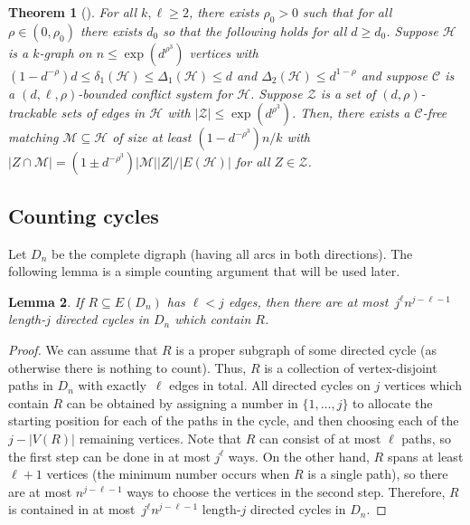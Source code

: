 \documentclass[a4paper, 11pt,reqno]{amsart}
\newcommand{\calC}{\mathcal{C}}
\newcommand{\calH}{\mathcal{H}}
\newcommand{\calM}{\mathcal{M}}
\theoremstyle{plain}
\newtheorem{theorem}{Theorem}[section]
\newtheorem{lemma}[theorem]{Lemma}
\theoremstyle{definition}
\numberwithin{equation}{section}
\begin{document}
\begin{theorem}[{\cite[Theorem 3.2]{GJKKL2022}}] \label{theorem:hypergraphmatching}
	For all $k, \ell \geq 2$, there exists $\rho_0 > 0$ such that for all 
	$\rho \in (0, \rho_0)$ there exists $d_0$ so that the following holds for all $d \geq d_0$.
	Suppose $\calH$ is a $k$-graph on $n \leq \exp(d^{\rho^3})$ vertices with 
	$(1 - d^{-\rho})d \leq \delta_1(\calH) \leq \Delta_1(\calH) \leq d$ 
	and $\Delta_2(\calH) \leq d^{1 - \rho}$ and suppose $\calC$ is 
	a $(d, \ell, \rho)$-bounded conflict system for $\calH$.
	Suppose $\mathcal{Z}$ is a set of $(d, \rho)$-trackable 
	sets of edges in $\calH$ with ${|\mathcal{Z}| \leq \exp(d^{\rho^3})}$.
	Then, there exists a $\calC$-free matching $\calM \subseteq \calH$ of size at least 
	${(1 - d^{-\rho^3})n/k}$ with $|Z \cap \calM| = (1 \pm d^{-\rho^3}) |\calM| |Z| / |E(\calH)|$ 
	for all $Z \in \mathcal{Z}$.
\end{theorem}

\subsection{Counting cycles}

Let $D_n$ be the complete digraph (having all arcs in both directions).
The following lemma is a simple counting argument that will be used later.

\begin{lemma} \label{lemma:countingcycles}
	If $R \subseteq E(D_n)$ has $\ell < j$ edges, then there are at most~$j^\ell n^{j - \ell - 1}$ 
	length-$j$ directed cycles in $D_n$ which contain $R$.
\end{lemma}

\begin{proof}
We can assume that $R$ is a proper subgraph of some directed cycle (as
otherwise there is nothing to count).  Thus, $R$ is a collection of
vertex-disjoint paths in $D_n$ with exactly~$\ell$ edges in total.  All
directed cycles on $j$ vertices which contain $R$ can be obtained by
assigning a number in $\{1, \dotsc, j\}$ to allocate the starting
position for each of the paths in the cycle, and then choosing each of
the $j - |V(R)|$ remaining vertices.  Note that $R$ can consist of at
most $\ell$ paths, so the first step can be done in at most $j^\ell$
ways.  On the other hand, $R$ spans at least $\ell + 1$ vertices (the
minimum number occurs when $R$ is a single path), so there are at most $n^{j
  - \ell - 1}$ ways to choose the vertices in the second step.
Therefore, $R$ is contained in at most~$j^\ell n^{j - \ell - 1}$
length-$j$ directed cycles in $D_n$.
\end{proof}
\end{document}
